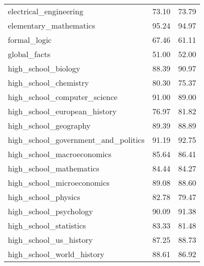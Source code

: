 \begin{table}[t]
\begin{tabular}{L{0.35}C{0.20}C{0.20}}
        electrical\_engineering                 & 73.10                    & 73.79                      \\
        elementary\_mathematics                 & 95.24                    & 94.97                      \\
        formal\_logic                           & 67.46                    & 61.11                      \\
        global\_facts                           & 51.00                    & 52.00                      \\
        high\_school\_biology                   & 88.39                    & 90.97                      \\
        high\_school\_chemistry                 & 80.30                    & 75.37                      \\
        high\_school\_computer\_science         & 91.00                    & 89.00                      \\
        high\_school\_european\_history         & 76.97                    & 81.82                      \\
        high\_school\_geography                 & 89.39                    & 88.89                      \\
        high\_school\_government\_and\_politics & 91.19                    & 92.75                      \\
        high\_school\_macroeconomics            & 85.64                    & 86.41                      \\
        high\_school\_mathematics               & 84.44                    & 84.27                      \\
        high\_school\_microeconomics            & 89.08                    & 88.60                      \\
        high\_school\_physics                   & 82.78                    & 79.47                      \\
        high\_school\_psychology                & 90.09                    & 91.38                      \\
        high\_school\_statistics                & 83.33                    & 81.48                      \\
        high\_school\_us\_history               & 87.25                    & 88.73                      \\
        high\_school\_world\_history            & 88.61                    & 86.92                      \\

\end{tabular}
\end{table}
